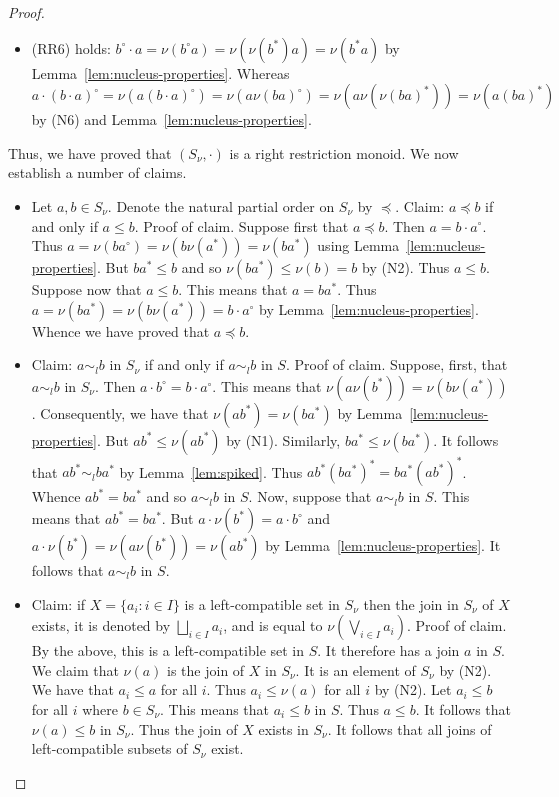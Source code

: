 \documentclass[10pt,a4paper]{amsart}
\begin{document}
\begin{proof}
\begin{itemize}
\item (RR6) holds:
$b^{\circ} \cdot a = \nu (b^{\circ}a) = \nu (\nu(b^{\ast})a) = \nu (b^{\ast}a)$ by Lemma~\ref{lem:nucleus-properties}.
Whereas
$a \cdot (b \cdot a)^{\circ} = \nu (a(b \cdot a)^{\circ}) = \nu (a \nu(ba)^{\circ}) = \nu (a \nu (\nu (ba)^{\ast})) = \nu (a(ba)^{\ast})$
by (N6) and  Lemma~\ref{lem:nucleus-properties}.
\end{itemize}


Thus, we have proved that $(S_{\nu},\cdot)$ is a right restriction monoid.
We now establish a number of claims.
\begin{itemize}


\item Let $a,b \in S_{\nu}$.
Denote the natural partial order on $S_{\nu}$ by $\preceq$.
Claim: $a \preceq b$ if and only if $a \leq b$.
Proof of claim.
Suppose first that $a \preceq b$.
Then $a = b \cdot a^{\circ}$.
Thus $a = \nu (ba^{\circ}) = \nu (b \nu(a^{\ast})) = \nu (ba^{\ast})$
using Lemma~\ref{lem:nucleus-properties}.
But $ba^{\ast} \leq b$ and so $\nu (ba^{\ast}) \leq \nu (b) = b$ by (N2).
Thus $a \leq b$.
Suppose now that $a \leq b$.
This means that $a = ba^{\ast}$.
Thus $a = \nu(ba^{\ast}) = \nu (b \nu (a^{\ast})) = b \cdot a^{\circ}$
by Lemma~\ref{lem:nucleus-properties}.
Whence we have proved that $a \preceq b$.

\item Claim:  $a \sim_{l} b$ in $S_{\nu}$ if and only if $a \sim_{l} b$ in $S$.
Proof of claim.
Suppose, first, that $a \sim_{l} b$ in $S_{\nu}$.
Then $a \cdot b^{\circ} = b \cdot a^{\circ}$.
This means that $\nu (a \nu (b^\ast)) = \nu (b \nu (a^{\ast}))$.
Consequently, we have that $\nu (ab^{\ast}) = \nu (ba^{\ast})$
by  Lemma~\ref{lem:nucleus-properties}.
But $ab^{\ast} \leq \nu (ab^{\ast})$ by (N1).
Similarly, $ba^{\ast} \leq  \nu (ba^{\ast})$.
It follows that $ab^{\ast} \sim_{l} ba^{\ast}$ by Lemma~\ref{lem:spiked}.
Thus $ab^{\ast}(ba^{\ast})^{\ast} = ba^{\ast}(ab^{\ast})^{\ast}$.
Whence $ab^{\ast} = ba^{\ast}$ and so $a \sim_{l} b$ in $S$.
Now, suppose that $a \sim_{l} b$ in $S$.
This means that $ab^{\ast} = ba^{\ast}$.
But $a \cdot \nu (b^{\ast}) = a \cdot b^{\circ}$
and $a \cdot \nu (b^{\ast}) = \nu (a \nu (b^{\ast})) = \nu (ab^{\ast})$ by Lemma~\ref{lem:nucleus-properties}.
It follows that $a \sim_{l} b$ in $S$.

\item Claim: if $X = \{a_{i} \colon i \in I\}$ is a left-compatible set in $S_{\nu}$
then the join in $S_{\nu}$ of $X$ exists, it is denoted by  $\bigsqcup_{i \in I} a_{i}$,
and is equal to $\nu\left(  \bigvee_{i \in I} a_{i} \right)$.
Proof of claim.
By the above, this is a left-compatible set in $S$.
It therefore has a join $a$ in $S$.
We claim that $\nu (a)$ is the join of $X$ in $S_{\nu}$.
It is an element of $S_{\nu}$ by (N2).
We have that $a_{i} \leq a$ for all $i$.
Thus  $a_{i} \leq \nu (a)$ for all $i$ by (N2).
Let $a_{i} \leq b$ for all $i$ where $b \in S_{\nu}$.
This means that $a_{i} \leq b$ in $S$.
Thus $a \leq b$.
It follows that $\nu (a) \leq b$ in $S_{\nu}$.
Thus the join of $X$ exists in $S_{\nu}$.
It follows that all joins of left-compatible subsets of $S_{\nu}$ exist.


\end{itemize}
\end{proof}
\end{document}
